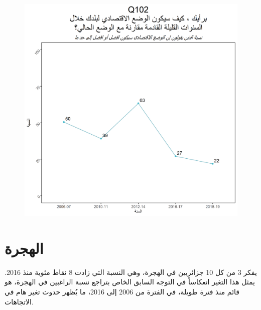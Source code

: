 \documentclass{article}
\begin{document}
	\begin{center}
		\begin{figure}[H]
			\centering
			\includegraphics[width=13cm]{Q102_.png}
		\end{figure}
	\end{center}
	
\section*{الهجرة}

 يفكر 3 من كل 10 جزائريين في الهجرة، وهي النسبة التي زادت 8 نقاط مئوية منذ 2016. يمثل هذا التغير انعكاساً في التوجه السابق الخاص بتراجع نسبة الراغبين في الهجرة، هو قائم منذ فترة طويلة، في الفترة من 2006 إلى 2016، ما يُظهر حدوث تغير هام في الاتجاهات.
	
\end{document}
